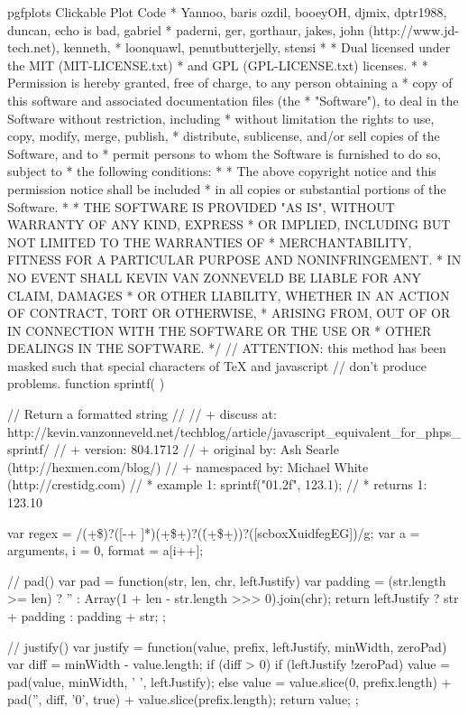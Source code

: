 {{\begin{insDLJS}[processAnnotatedPlot]{\jobname}{pgfplots Clickable Plot Code}
 * Yannoo, baris ozdil, booeyOH, djmix, dptr1988, duncan, echo is bad, gabriel
 * paderni, ger, gorthaur, jakes, john (http://www.jd-tech.net), kenneth,
 * loonquawl, penutbutterjelly, stensi
 * 
 * Dual licensed under the MIT (MIT-LICENSE.txt)
 * and GPL (GPL-LICENSE.txt) licenses.
 * 
 * Permission is hereby granted, free of charge, to any person obtaining a
 * copy of this software and associated documentation files (the
 * "Software"), to deal in the Software without restriction, including
 * without limitation the rights to use, copy, modify, merge, publish,
 * distribute, sublicense, and/or sell copies of the Software, and to
 * permit persons to whom the Software is furnished to do so, subject to
 * the following conditions:
 * 
 * The above copyright notice and this permission notice shall be included
 * in all copies or substantial portions of the Software.
 * 
 * THE SOFTWARE IS PROVIDED "AS IS", WITHOUT WARRANTY OF ANY KIND, EXPRESS
 * OR IMPLIED, INCLUDING BUT NOT LIMITED TO THE WARRANTIES OF
 * MERCHANTABILITY, FITNESS FOR A PARTICULAR PURPOSE AND NONINFRINGEMENT.
 * IN NO EVENT SHALL KEVIN VAN ZONNEVELD BE LIABLE FOR ANY CLAIM, DAMAGES
 * OR OTHER LIABILITY, WHETHER IN AN ACTION OF CONTRACT, TORT OR OTHERWISE,
 * ARISING FROM, OUT OF OR IN CONNECTION WITH THE SOFTWARE OR THE USE OR
 * OTHER DEALINGS IN THE SOFTWARE.
 */ 
// ATTENTION: this method has been masked such that special characters of TeX and javascript 
// don't produce problems.
function sprintf( ) {
    // Return a formatted string
    // 
    // +    discuss at: http://kevin.vanzonneveld.net/techblog/article/javascript_equivalent_for_phps_sprintf/
    // +       version: 804.1712
    // +   original by: Ash Searle (http://hexmen.com/blog/)
    // + namespaced by: Michael White (http://crestidg.com)
    // *     example 1: sprintf("\pgfplotsPERCENT01.2f", 123.1);
    // *     returns 1: 123.10

    var regex = /\pgfplotsPERCENT\pgfplotsPERCENT\pgfplotsVERTBAR\pgfplotsPERCENT(\d+\$)?([-+ ]*)(\*\d+\$\pgfplotsVERTBAR\*\pgfplotsVERTBAR\d+)?(\.(\*\d+\$\pgfplotsVERTBAR\*\pgfplotsVERTBAR\d+))?([scboxXuidfegEG])/g;
    var a = arguments, i = 0, format = a[i++];

    // pad()
    var pad = function(str, len, chr, leftJustify) {
        var padding = (str.length >= len) ? '' : Array(1 + len - str.length >>> 0).join(chr);
        return leftJustify ? str + padding : padding + str;
    };

    // justify()
    var justify = function(value, prefix, leftJustify, minWidth, zeroPad) {
        var diff = minWidth - value.length;
        if (diff > 0) {
            if (leftJustify \pgfplotsVERTBAR\pgfplotsVERTBAR !zeroPad) {
            value = pad(value, minWidth, ' ', leftJustify);
            } else {
            value = value.slice(0, prefix.length) + pad('', diff, '0', true) + value.slice(prefix.length);
            }
        }
        return value;
    };

}
\end{insDLJS}}}
